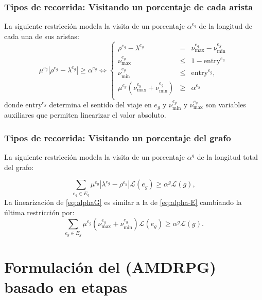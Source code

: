 \documentclass[slidestop,usepdftitle=false, xcolor=table]{beamer}
\begin{document}
	\begin{frame}
		\frametitle{Tipos de recorrida: Visitando un porcentaje de cada arista}
		La siguiente restricción modela la visita de un porcentaje $\alpha^{e_g}$ de la longitud de cada una de sus aristas:
		\begin{equation}\label{eq:alpha-E}\tag{$\alpha$-E}
 \mu^{e_g}|\rho^{e_g}-\lambda^{e_g}|\geq \alpha^{e_g} \Longleftrightarrow
 \left\{
 \begin{array}{ccl}
  \rho^{e_g} - \lambda^{e_g}                       & =    & \nu_\text{max}^{e_g} - \nu_\text{min}^{e_g}                                     \\
  \nu_\text{max}^{e_g}                         & \leq & 1-{\text{entry}^{e_g}}                                    \\
  \nu_\text{min}^{e_g}                      & \leq & {  \text{entry}^{e_g}},                                        \\
  \mu^{e_g}(\nu_\text{max}^{e_g} + \nu_\text{min}^{e_g} ) & \geq & \alpha^{e_g}
  \\
 \end{array}
 \right.
\end{equation}
donde $\text{entry}^{e_g}$ determina el sentido del viaje en $e_g$ y $\nu_\text{min}^{e_g}$ y $\nu_\text{max}^{e_g}$ son variables auxiliares que permiten linearizar el valor absoluto. 
\end{frame}

	\begin{frame}
		\frametitle{Tipos de recorrida: Visitando un porcentaje del grafo}
La siguiente restricción modela la visita de un porcentaje $\alpha^g$ de la longitud total del grafo:		

\begin{equation}\label{eq:alphaG}\tag{$\alpha$-G}
    \sum_{e_g\in E_g} \mu^{e_g}|\lambda^{e_g} - \rho^{e_g}|\mathcal L(e_g) \geq \alpha^g\mathcal L(g),
\end{equation}
La linearización de \eqref{eq:alphaG} es similar a la de \eqref{eq:alpha-E} cambiando la última restricción por:
\begin{equation}\label{eq:alpha-G}\tag{$\alpha$-G}
\sum_{e_g\in E_g} \mu^{e_g}(\nu_\text{max}^{e_g} + \nu_\text{min}^{e_g})\mathcal L(e_g)\geq \alpha^g\mathcal L(g).
\end{equation}
\end{frame}

\section{Formulación del (AMDRPG) basado en etapas}
\end{document}

